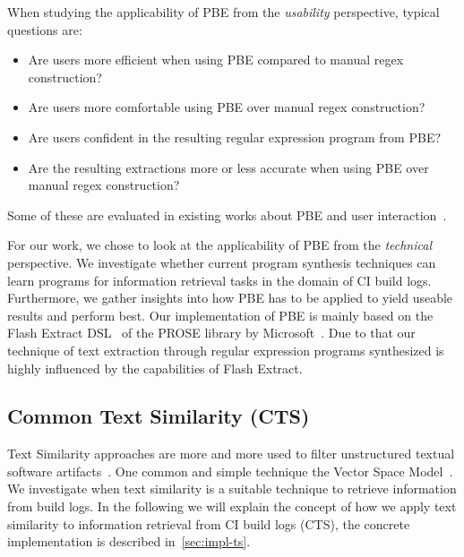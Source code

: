 \documentclass[\myrootdir/main.tex]{subfiles}
\begin{document}
When studying the applicability of PBE from the \emph{usability} perspective, typical questions are:
\begin{itemize}
	\item Are users more efficient when using PBE compared to manual regex construction?
	\item Are users more comfortable using PBE over manual regex construction?
	\item Are users confident in the resulting regular expression program from PBE?
	\item Are the resulting extractions more or less accurate when using PBE over manual regex construction?
\end{itemize}
Some of these are evaluated in existing works about PBE and user interaction~\cite{mayer2015user,lau2009why-programming-by-demonstration,miller2001outlier}.

For our work, we chose to look at the applicability of PBE from the \emph{technical} perspective.
We investigate whether current program synthesis techniques can learn programs for information retrieval tasks in the domain of CI build logs.
Furthermore, we gather insights into how PBE has to be applied to yield useable results and perform best.
Our implementation of PBE is mainly based on the Flash Extract DSL~\cite{le2014flashextract:} of the PROSE library by Microsoft~\cite{prose2019webpage}.
Due to that our technique of text extraction through regular expression programs synthesized is highly influenced by the capabilities of Flash Extract.

\subsection{Common Text Similarity (CTS)}
\label{sec:expl-ts}
Text Similarity approaches are more and more used to filter unstructured textual software artifacts~\cite{runeson2007detection,marcus2005recovery,antoniol2002recovering,mccarey2006recommending}.
One common and simple technique the Vector Space Model~\cite{schutze2008introduction}.
We investigate when text similarity is a suitable technique to retrieve information from build logs.
In the following we will explain the concept of how we apply text similarity to information retrieval from CI build logs (CTS), the concrete implementation is described in~\ref{sec:impl-ts}.
\end{document}
